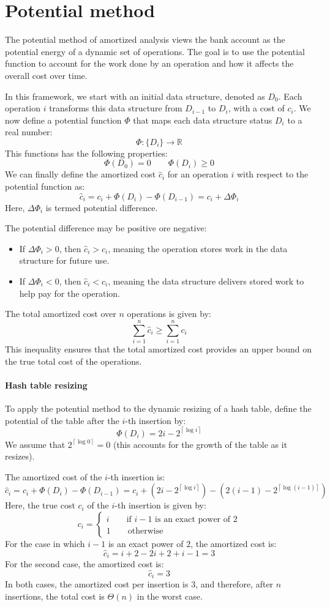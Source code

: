 \section{Potential method}

The potential method of amortized analysis views the bank account as the potential energy of a dynamic set of operations. 
The goal is to use the potential function to account for the work done by an operation and how it affects the overall cost over time.

In this framework, we start with an initial data structure, denoted as $D_0$. 
Each operation $i$ transforms this data structure from $D_{i-1}$ to $D_i$, with a cost of $c_i$.
We now define a potential function $\Phi$ that maps each data structure status $D_i$ to a real number: 
\[\Phi: \{D_i\} \rightarrow \mathbb{R}\]
This functions has the following properties: 
\[\Phi(D_0 ) = 0 \qquad \Phi(D_i ) \geq 0\]
We can finally define the amortized cost $\hat{c}_i$ for an operation $i$ with respect to the potential function as:
\[\hat{c}_i=c_i+\Phi(D_i)-\Phi(D_{i-1})=c_i+\Delta\Phi_i\]
Here, $\Delta\Phi_i$ is termed potential difference. 

The potential difference may be positive ore negative: 
\begin{itemize}
    \item If $\Delta\Phi_i>0$, then $\hat{c}_i>c_i$, meaning the operation stores work in the data structure for future use.
    \item If $\Delta\Phi_i<0$, then $\hat{c}_i<c_i$, meaning the data structure delivers stored work to help pay for the operation.
\end{itemize}
The total amortized cost over $n$ operations is given by:
\[\sum_{i=1}^n\hat{c}_i\geq\sum_{i=1}^nc_i\]
This inequality ensures that the total amortized cost provides an upper bound on the true total cost of the operations.

\paragraph*{Hash table resizing}
To apply the potential method to the dynamic resizing of a hash table, define the potential of the table after the $i$-th insertion by: 
\[\Phi(D_i) =2i - 2^{\left\lceil \log i\right\rceil }\] 
We assume that $2^{\left\lceil \log 0\right\rceil }=0$ (this accounts for the growth of the table as it resizes). 

The amortized cost of the $i$-th insertion is:
\[\hat{c}_i=c_i+\Phi(D_i)-\Phi(D_{i-1})=c_i+(2i - 2^{\left\lceil \log i\right\rceil })-(2(i-1) - 2^{\left\lceil \log (i-1)\right\rceil })\]
Here, the true cost $c_i$ of the $i$-th insertion is given by:
\[c_i=\begin{cases}
    i \qquad \text{if }i-1\text{ is an exact power of }2 \\
    1 \qquad \text{otherwise}
\end{cases}\]
For the case in which $i-1$ is an exact power of $2$, the amortized cost is:
\[\hat{c}_i=i + 2 - 2i + 2 + i - 1=3\]
For the second case, the amortized cost is:
\[\hat{c}_i=3\]
In both cases, the amortized cost per insertion is 3, and therefore, after $n$ insertions, the total cost is $\Theta(n)$ in the worst case.